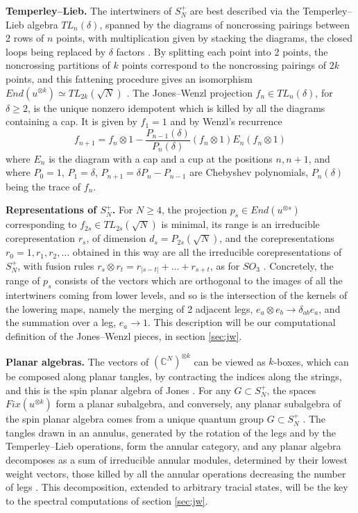 \documentclass[11pt]{amsart}
\begin{document}
\medskip

\noindent\textbf{Temperley--Lieb.} The intertwiners of $S_N^+$ are best described via the Temperley--Lieb algebra $TL_n(\delta)$, spanned by the diagrams of noncrossing pairings between 2 rows of $n$ points, with multiplication given by stacking the diagrams, the closed loops being replaced by $\delta$ factors \cite{jo1,tle}. By splitting each point into 2 points, the noncrossing partitions of $k$ points correspond to the noncrossing pairings of $2k$ points, and this fattening procedure gives an isomorphism $End(u^{\otimes k})\simeq TL_{2k}(\sqrt N)$ \cite{ba1x}. The Jones--Wenzl projection $f_n\in TL_n(\delta)$, for $\delta\geq2$, is the unique nonzero idempotent which is killed by all the diagrams containing a cap. It is given by $f_1=1$ and by Wenzl's recurrence \cite{wen}
$$f_{n+1}=f_n\otimes1-\frac{P_{n-1}(\delta)}{P_n(\delta)}(f_n\otimes1)E_n(f_n\otimes1)$$
where $E_n$ is the diagram with a cap and a cup at the positions $n,n+1$, and where $P_0=1$, $P_1=\delta$, $P_{n+1}=\delta P_n-P_{n-1}$ are Chebyshev polynomials, $P_n(\delta)$ being the trace of $f_n$.

\medskip

\noindent\textbf{Representations of $S_N^+$.} For $N\geq4$, the projection $p_s\in End(u^{\otimes s})$ corresponding to $f_{2s}\in TL_{2s}(\sqrt N)$ is minimal, its range is an irreducible corepresentation $r_s$, of dimension $d_s=P_{2s}(\sqrt N)$, and the corepresentations $r_0=1,r_1,r_2,\ldots$ obtained in this way are all the irreducible corepresentations of $S_N^+$, with fusion rules $r_s\otimes r_t=r_{|s-t|}+\ldots+r_{s+t}$, as for $SO_3$ \cite{ba1x}. Concretely, the range of $p_s$ consists of the vectors which are orthogonal to the images of all the intertwiners coming from lower levels, and so is the intersection of the kernels of the lowering maps, namely the merging of 2 adjacent legs, $e_a\otimes e_b\to\delta_{ab}e_a$, and the summation over a leg, $e_a\to1$. This description will be our computational definition of the Jones--Wenzl pieces, in section \ref{sec:jw}.

\medskip

\noindent\textbf{Planar algebras.} The vectors of $(\mathbb C^N)^{\otimes k}$ can be viewed as $k$-boxes, which can be composed along planar tangles, by contracting the indices along the strings, and this is the spin planar algebra of Jones \cite{jon}. For any $G\subset S_N^+$, the spaces $Fix(u^{\otimes k})$ form a planar subalgebra, and conversely, any planar subalgebra of the spin planar algebra comes from a unique quantum group $G\subset S_N^+$ \cite{ba2}. The tangles drawn in an annulus, generated by the rotation of the legs and by the Temperley--Lieb operations, form the annular category, and any planar algebra decomposes as a sum of irreducible annular modules, determined by their lowest weight vectors, those killed by all the annular operations decreasing the number of legs \cite{jo2}. This decomposition, extended to arbitrary tracial states, will be the key to the spectral computations of section \ref{sec:jw}.
\end{document}

